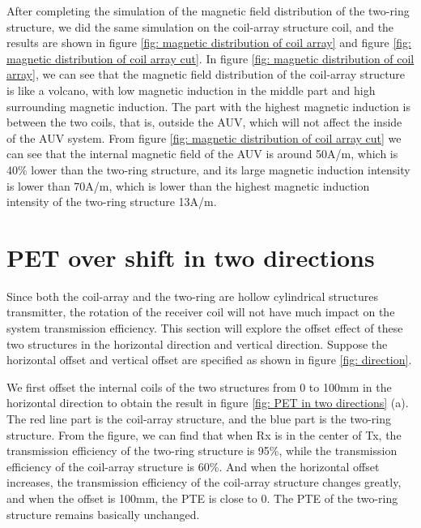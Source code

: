 After completing the simulation of the magnetic field distribution of the two-ring structure, we did the same simulation on the coil-array structure coil, and the results are shown in figure \ref{fig: magnetic distribution of coil array} and figure \ref{fig: magnetic distribution of coil array cut}.
In figure \ref{fig: magnetic distribution of coil array}, we can see that the magnetic field distribution of the coil-array structure is like a volcano, with low magnetic induction in the middle part and high surrounding magnetic induction. The part with the highest magnetic induction is between the two coils, that is, outside the AUV, which will not affect the inside of the AUV system. From figure \ref{fig: magnetic distribution of coil array cut} we can see that the internal magnetic field of the AUV is around 50A/m, which is 40\% lower than the two-ring structure, and its large magnetic induction intensity is lower than 70A/m, which is lower than the highest magnetic induction intensity of the two-ring structure 13A/m.


\section{PET over shift in two directions}

Since both the coil-array and the two-ring are hollow cylindrical structures transmitter, the rotation of the receiver coil will not have much impact on the system transmission efficiency. This section will explore the offset effect of these two structures in the horizontal direction and vertical direction.
Suppose the horizontal offset and vertical offset are specified as shown in figure \ref{fig: direction}.

We first offset the internal coils of the two structures from 0 to 100mm in the horizontal direction to obtain the result in figure \ref{fig: PET in two directions} (a). The red line part is the coil-array structure, and the blue part is the two-ring structure. From the figure, we can find that when Rx is in the center of Tx, the transmission efficiency of the two-ring structure is 95\%, while the transmission efficiency of the coil-array structure is 60\%. And when the horizontal offset increases, the transmission efficiency of the coil-array structure changes greatly, and when the offset is 100mm, the PTE is close to 0. The PTE of the two-ring structure remains basically unchanged.

